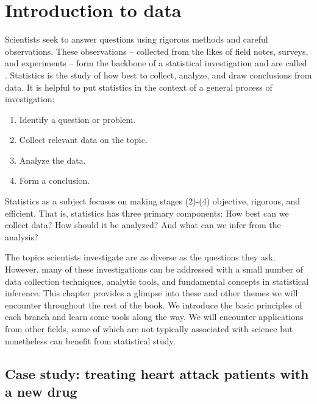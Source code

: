 \chapter{Introduction to data}
\label{introductionToData}


Scientists seek to answer questions using rigorous methods and careful observations. These observations -- collected from the likes of field notes, surveys, and experiments -- form the backbone of a statistical investigation and are called . Statistics is the study of how best to collect, analyze, and draw conclusions from data. It is helpful to put statistics in the context of a general process of investigation:
\begin{enumerate}
\setlength{\itemsep}{0mm}
\item Identify a question or problem.
\item Collect relevant data on the topic.
\item Analyze the data.
\item Form a conclusion.
\end{enumerate}
Statistics as a subject focuses on making stages (2)-(4) objective, rigorous, and efficient. That is, statistics has three primary components: How best can we collect data? How should it be analyzed? And what can we infer from the analysis?

The topics scientists investigate are as diverse as the questions they ask. However, many of these investigations can be addressed with a small number of data collection techniques, analytic tools, and fundamental concepts in statistical inference. This chapter provides a glimpse into these and other themes we will encounter throughout the rest of the book. We introduce the basic principles of each branch and learn some tools along the way. We will encounter applications from other fields, some of which are not typically associated with science but nonetheless can benefit from statistical study.

\section[Case study]{Case study: treating heart attack patients with a new drug}
\label{basicExampleOfSulphinpyrazone}

